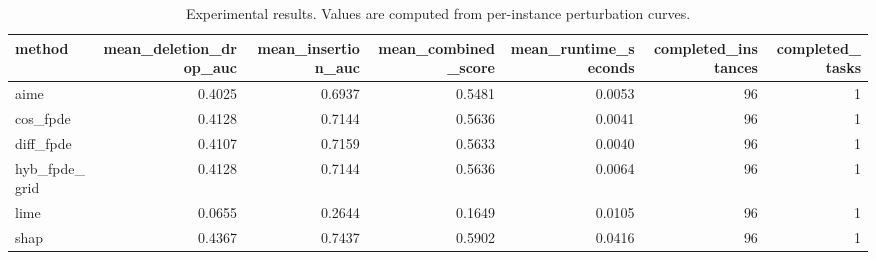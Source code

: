 \begin{table}[t]
\caption{Experimental results. Values are computed from per-instance perturbation curves.}
\label{tab:main_results_computed}
\centering
\begin{tabular}{lrrrrrr}
\toprule
method & mean\_deletion\_drop\_auc & mean\_insertion\_auc & mean\_combined\_score & mean\_runtime\_seconds & completed\_instances & completed\_tasks \\
\midrule
aime & 0.4025 & 0.6937 & 0.5481 & 0.0053 & 96 & 1 \\
cos\_fpde & 0.4128 & 0.7144 & 0.5636 & 0.0041 & 96 & 1 \\
diff\_fpde & 0.4107 & 0.7159 & 0.5633 & 0.0040 & 96 & 1 \\
hyb\_fpde\_grid & 0.4128 & 0.7144 & 0.5636 & 0.0064 & 96 & 1 \\
lime & 0.0655 & 0.2644 & 0.1649 & 0.0105 & 96 & 1 \\
shap & 0.4367 & 0.7437 & 0.5902 & 0.0416 & 96 & 1 \\
\bottomrule
\end{tabular}

\end{table}
